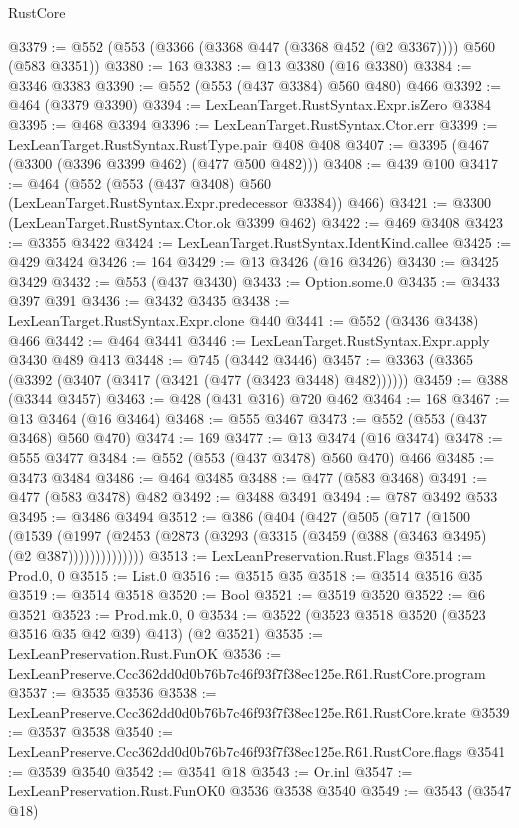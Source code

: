 \begin{lexlean}{RustCore}
\begin{coremodule}
@3379 := @552 (@553 (@3366 (@3368 @447 (@3368 @452 (@2 @3367)))) @560 (@583 @3351))
@3380 := 163
@3383 := @13 @3380 (@16 @3380)
@3384 := @3346 @3383
@3390 := @552 (@553 (@437 @3384) @560 @480) @466
@3392 := @464 (@3379 @3390)
@3394 := LexLeanTarget.RustSyntax.Expr.isZero @3384
@3395 := @468 @3394
@3396 := LexLeanTarget.RustSyntax.Ctor.err
@3399 := LexLeanTarget.RustSyntax.RustType.pair @408 @408
@3407 := @3395 (@467 (@3300 (@3396 @3399 @462) (@477 @500 @482)))
@3408 := @439 @100
@3417 := @464 (@552 (@553 (@437 @3408) @560 (LexLeanTarget.RustSyntax.Expr.predecessor @3384)) @466)
@3421 := @3300 (LexLeanTarget.RustSyntax.Ctor.ok @3399 @462)
@3422 := @469 @3408
@3423 := @3355 @3422
@3424 := LexLeanTarget.RustSyntax.IdentKind.callee
@3425 := @429 @3424
@3426 := 164
@3429 := @13 @3426 (@16 @3426)
@3430 := @3425 @3429
@3432 := @553 (@437 @3430)
@3433 := Option.some.{0}
@3435 := @3433 @397 @391
@3436 := @3432 @3435
@3438 := LexLeanTarget.RustSyntax.Expr.clone @440
@3441 := @552 (@3436 @3438) @466
@3442 := @464 @3441
@3446 := LexLeanTarget.RustSyntax.Expr.apply @3430 @489 @413
@3448 := @745 (@3442 @3446)
@3457 := @3363 (@3365 (@3392 (@3407 (@3417 (@3421 (@477 (@3423 @3448) @482))))))
@3459 := @388 (@3344 @3457)
@3463 := @428 (@431 @316) @720 @462
@3464 := 168
@3467 := @13 @3464 (@16 @3464)
@3468 := @555 @3467
@3473 := @552 (@553 (@437 @3468) @560 @470)
@3474 := 169
@3477 := @13 @3474 (@16 @3474)
@3478 := @555 @3477
@3484 := @552 (@553 (@437 @3478) @560 @470) @466
@3485 := @3473 @3484
@3486 := @464 @3485
@3488 := @477 (@583 @3468)
@3491 := @477 (@583 @3478) @482
@3492 := @3488 @3491
@3494 := @787 @3492 @533
@3495 := @3486 @3494
@3512 := @386
    (@404
      (@427
        (@505
          (@717
            (@1500
              (@1539
                (@1997 (@2453 (@2873 (@3293 (@3315 (@3459 (@388 (@3463 @3495) (@2 @387))))))))))))))
@3513 := LexLeanPreservation.Rust.Flags
@3514 := Prod.{0, 0}
@3515 := List.{0}
@3516 := @3515 @35
@3518 := @3514 @3516 @35
@3519 := @3514 @3518
@3520 := Bool
@3521 := @3519 @3520
@3522 := @6 @3521
@3523 := Prod.mk.{0, 0}
@3534 := @3522 (@3523 @3518 @3520 (@3523 @3516 @35 @42 @39) @413) (@2 @3521)
@3535 := LexLeanPreservation.Rust.FunOK
@3536 := LexLeanPreserve.Ccc362dd0d0b76b7c46f93f7f38ec125e.R61.RustCore.program
@3537 := @3535 @3536
@3538 := LexLeanPreserve.Ccc362dd0d0b76b7c46f93f7f38ec125e.R61.RustCore.krate
@3539 := @3537 @3538
@3540 := LexLeanPreserve.Ccc362dd0d0b76b7c46f93f7f38ec125e.R61.RustCore.flags
@3541 := @3539 @3540
@3542 := @3541 @18
@3543 := Or.inl
@3547 := LexLeanPreservation.Rust.FunOK0 @3536 @3538 @3540
@3549 := @3543 (@3547 @18)

\end{coremodule}
\end{lexlean}

